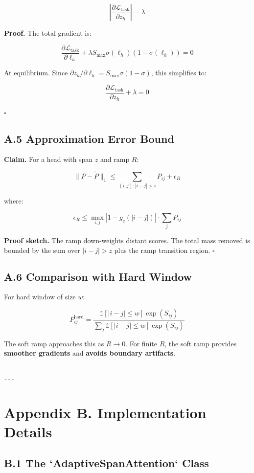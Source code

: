 \[
\left|\frac{\partial \mathcal{L}_\text{task}}{\partial z_h}\right| = \lambda
\]

\textbf{Proof.} The total gradient is:

\[
\frac{\partial \mathcal{L}_\text{task}}{\partial \ell_h} + \lambda S_\text{max} \sigma(\ell_h)(1 - \sigma(\ell_h)) = 0
\]

At equilibrium. Since $\partial z_h / \partial \ell_h = S_\text{max} \sigma(1-\sigma)$, 
this simplifies to:

\[
\frac{\partial \mathcal{L}_\text{task}}{\partial z_h} + \lambda = 0
\]

$\square$

\subsection{A.5 Approximation Error Bound}

\textbf{Claim.} For a head with span $z$ and ramp $R$:

\[
\|P - \tilde{P}\|_1 \leq \sum_{(i,j): |i-j| > z} P_{ij} + \epsilon_R
\]

where:

\[
\epsilon_R \leq \max_{i,j} |1 - g_z(|i-j|)| \cdot \sum_j P_{ij}
\]

\textbf{Proof sketch.} The ramp down-weights distant scores. The total mass 
removed is bounded by the sum over $|i-j| > z$ plus the ramp transition 
region. $\square$

\subsection{A.6 Comparison with Hard Window}

For hard window of size $w$:

\[
P_{ij}^{\text{hard}} = \frac{\mathbb{1}[|i-j| \le w] \exp(S_{ij})}{\sum_j \mathbb{1}[|i-j| \le w] \exp(S_{ij})}
\]

The soft ramp approaches this as $R \to 0$. For finite $R$, the soft ramp 
provides \textbf{smoother gradients} and \textbf{avoids boundary artifacts}.
\begin{lstlisting}

---
\end{lstlisting}


\section{Appendix B. Implementation Details}

\subsection{B.1 The `AdaptiveSpanAttention` Class}

